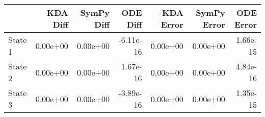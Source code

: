 \begin{tabular}{lrrrrrr}
\toprule
{} &  KDA Diff &  SymPy Diff &  ODE Diff &  KDA Error &  SymPy Error &  ODE Error \\
\midrule
State 1 &  0.00e+00 &    0.00e+00 & -6.11e-16 &   0.00e+00 &     0.00e+00 &   1.66e-15 \\
State 2 &  0.00e+00 &    0.00e+00 &  1.67e-16 &   0.00e+00 &     0.00e+00 &   4.84e-16 \\
State 3 &  0.00e+00 &    0.00e+00 & -3.89e-16 &   0.00e+00 &     0.00e+00 &   1.35e-15 \\
\bottomrule
\end{tabular}

